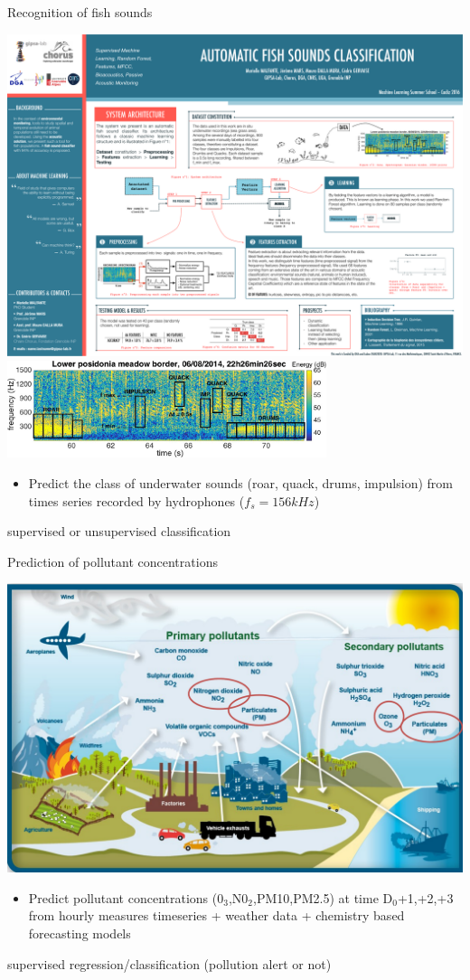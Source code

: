 \documentclass[pressentation,9pt,aspectratio=1610,xcolor=table]{beamer}
\newcommand{\doigt}{\noindent \Pisymbol{pzd}{43}}
\begin{document}
\begin{frame}{Recognition of fish sounds}

  \begin{center}
    \includegraphics[keepaspectratio=true,width=.3\textwidth]{get_data.pdf}
    \includegraphics[keepaspectratio=true,width=0.7\textwidth]{spectro_global_top_16384-small.jpg}
  \end{center}
  \begin{itemize}
  \item[\doigt] Predict the class of underwater sounds (roar, quack, drums, impulsion) from  times series recorded by hydrophones ($f_s=156kHz$)
  \end{itemize}

  \begin{center}
    \alert{supervised or unsupervised classification}
  \end{center}

\end{frame}

\begin{frame}{Prediction of pollutant concentrations}

  \begin{center}
    \includegraphics[width=.6\textwidth]{ATMO_challenge.png}\\
  \end{center}
  \begin{itemize}
  \item[\doigt] Predict pollutant concentrations (0$_3$,N0$_2$,PM10,PM2.5) at time D$_0$+1,+2,+3 from hourly measures timeseries + weather data + chemistry based forecasting models
  \end{itemize}
  \begin{center}
    \alert{supervised regression/classification (pollution alert or not)}
  \end{center}
\end{frame}
\end{document}
